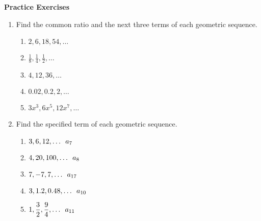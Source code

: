 \textbf{Practice Exercises}

\vspce

\begin{enumerate}[label = \Alph*. ]
\item \hspce Find the common ratio and the next three terms of each geometric sequence.   
	\begin{enumerate}[label = \arabic*. ]
	

	\item \hspce $2, 6, 18, 54,\ldots$
	\item \hspce $\displaystyle \frac{1}{8}, \frac{1}{4}, \frac{1}{2},\ldots $
	\item \hspce $4, 12, 36,\ldots$
	\item \hspce $0.02, 0.2, 2,\ldots$
	\item \hspce $3x^{3}, 6x^{5}, 12x^{7},\ldots $
	 
	\end{enumerate}


\item \hspce Find the specified term of each geometric sequence. 
	\begin{enumerate}[label = \arabic*. ]
	\item \hspce $3, 6, 12,\ldots \hspace{0.5em}  a_{7}$
	\item \hspce $4, 20, 100,\ldots \hspace{0.5em}  a_{8}$
	\item \hspce $7, -7, 7,\ldots \hspace{0.5em}  a_{17}$
	\item \hspce $3, 1.2, 0.48,\ldots \hspace{0.5em}  a_{10}$
	\item \hspce $\displaystyle 1, \frac{3}{2}, \frac{9}{4},\ldots \hspace{0.5em}  a_{11}$
	\end{enumerate}

\end{enumerate}
